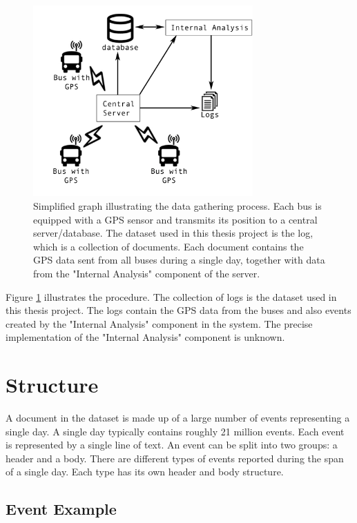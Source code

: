 \begin{figure}
    \centering
    \includegraphics[width=0.75\textwidth]{figures/data-gathering}
    \caption{Simplified graph illustrating the data gathering process. Each bus is equipped with a GPS sensor and transmits its position to a central server/database.
    The dataset used in this thesis project is the log, which is a collection of documents.
    Each document contains the GPS data sent from all buses during a single day, together with data from the "Internal Analysis" component of the server.}
    \label{fig:data-gathering}
\end{figure}

Figure \ref{fig:data-gathering} illustrates the procedure.
The collection of logs is the dataset used in this thesis project.
The logs contain the GPS data from the buses and also events created by the "Internal Analysis" component in the system.
The precise implementation of the "Internal Analysis" component is unknown.

\section{Structure} \label{sec:data-structure}
A document in the dataset is made up of a large number of events representing a single day.
A single day typically contains roughly 21  million events.  
Each event is represented by a single line of text.
An event can be split into two groups: a header and a body.
There are different types of events reported during the span of a single day.
Each type has its own header and body structure.

\subsection{Event Example}

